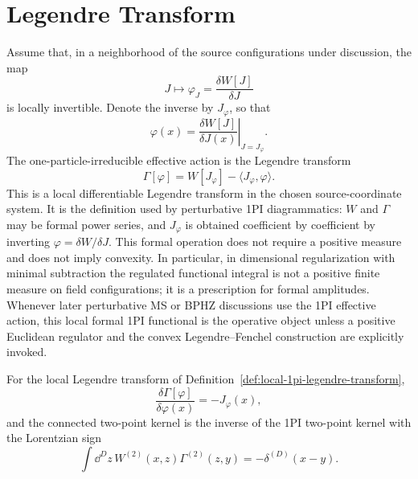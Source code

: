 \section{Legendre Transform}

\begin{definition}
\label{def:local-1pi-legendre-transform}
Assume that, in a neighborhood of the source configurations under discussion,
the map
\[
  J\longmapsto \varphi_J=\frac{\delta W[J]}{\delta J}
\]
is locally invertible.  Denote the inverse by \(J_{\varphi}\), so that
\[
  \varphi(x)=
  \left.
  \frac{\delta W[J]}{\delta J(x)}
  \right|_{J=J_{\varphi}} .
\]
The one-particle-irreducible effective action is the Legendre transform
\[
  \Gamma[\varphi]
  =
  W[J_{\varphi}]
  -
  \langle J_{\varphi},\varphi\rangle .
\]
This is a local differentiable Legendre transform in the chosen source-coordinate system.
It is the definition used by perturbative 1PI diagrammatics: \(W\) and
\(\Gamma\) may be formal power series, and \(J_\varphi\) is obtained
coefficient by coefficient by inverting
\(\varphi=\delta W/\delta J\).  This formal operation does not require a
positive measure and does not imply convexity.  In particular, in dimensional
regularization with minimal subtraction the regulated functional integral is
not a positive finite measure on field configurations; it is a prescription
for formal amplitudes.  Whenever later perturbative MS or BPHZ discussions use
the 1PI effective action, this local formal 1PI functional is the operative
object unless a positive Euclidean regulator and the convex
Legendre--Fenchel construction are explicitly invoked.
\end{definition}

\begin{lemma}
\label{lem:1pi-source-equation-inverse-kernel}
For the local Legendre transform of
Definition~\ref{def:local-1pi-legendre-transform},
\[
  \frac{\delta\Gamma[\varphi]}{\delta\varphi(x)}
  =
  -J_{\varphi}(x),
\]
and the connected two-point kernel is the inverse of the 1PI two-point kernel
with the Lorentzian sign
\[
  \int \dd^Dz\,
  W^{(2)}(x,z)\Gamma^{(2)}(z,y)
  =
  -\delta^{(D)}(x-y).
\]
\end{lemma}

